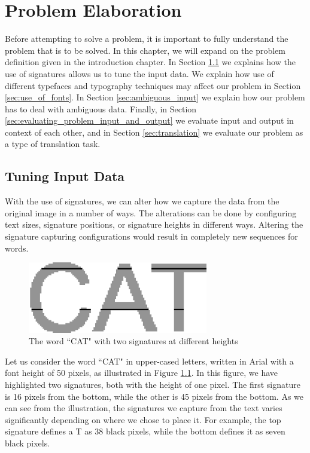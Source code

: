 
\chapter{Problem Elaboration}
\label{ch:problem}
Before attempting to solve a problem, it is important to fully understand the problem that is to be solved. In this chapter, we will expand on the problem definition given in the introduction chapter. In Section \ref{sec:tuning_input_data} we explains how the use of signatures allows us to tune the input data. We explain how use of different typefaces and typography techniques may affect our problem in Section \ref{sec:use_of_fonts}. In Section \ref{sec:ambiguous_input} we explain how our problem has to deal with ambiguous data. Finally, in Section \ref{sec:evaluating_problem_input_and_output} we evaluate input and output in context of each other, and in Section \ref{sec:translation} we evaluate our problem as a type of translation task.


\section{Tuning Input Data}
\label{sec:tuning_input_data}
With the use of signatures, we can alter how we capture the data from the original image in a number of ways. The alterations can be done by configuring text sizes, signature positions, or signature heights in different ways. Altering the signature capturing configurations would result in completely new sequences for words.

\begin{figure}[ht]
    \centering
    \includegraphics[width=0.7\textwidth]{fig/chapter2/signature_multiple.png}
    \caption{The word ``CAT" with two signatures at different heights}
    \label{fig:thesis-signature-comparison}
\end{figure}

Let us consider the word ``CAT" in upper-cased letters, written in Arial with a font height of 50 pixels, as illustrated in Figure \ref{fig:thesis-signature-comparison}. In this figure, we have highlighted two signatures, both with the height of one pixel. The first signature is 16 pixels from the bottom, while the other is 45 pixels from the bottom. As we can see from the illustration, the signatures we capture from the text varies significantly depending on where we chose to place it. For example, the top signature defines a T as 38 black pixels, while the bottom defines it as seven black pixels.

